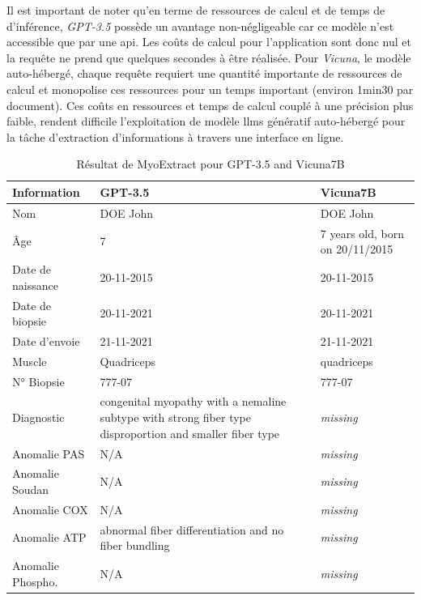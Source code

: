 Il est important de noter qu'en terme de ressources de calcul et de temps de d'inférence, \textit{GPT-3.5} possède un avantage non-négligeable car ce modèle n'est accessible que par une \gls{api}. Les coûts de calcul pour l'application sont donc nul et la requête ne prend que quelques secondes à être réalisée. Pour \textit{Vicuna}, le modèle auto-hébergé, chaque requête requiert une quantité importante de ressources de calcul et monopolise ces ressources pour un temps important (environ 1min30 par document). Ces coûts en ressources et temps de calcul couplé à une précision plus faible, rendent difficile l'exploitation de modèle \gls{llms} génératif auto-hébergé pour la tâche d'extraction d'informations à travers une interface en ligne.
\begin{table}[ht]
\centering
\caption{Résultat de MyoExtract pour GPT-3.5 and Vicuna7B}
\label{tab:json_data}
\begin{tabularx}{\textwidth}{|X|X|X|}
\hline
\textbf{Information} & \textbf{GPT-3.5} & \textbf{Vicuna7B} \\ \hline
Nom & DOE John & DOE John \\ \hline
Âge & 7 & 7 years old, born on 20/11/2015 \\ \hline
Date de naissance & 20-11-2015 & 20-11-2015 \\ \hline
Date de biopsie & 20-11-2021 & 20-11-2021 \\ \hline
Date d'envoie & 21-11-2021 & 21-11-2021 \\ \hline
Muscle & Quadriceps & quadriceps \\ \hline
N° Biopsie & 777-07 & 777-07 \\ \hline
Diagnostic & congenital myopathy with a nemaline subtype with strong fiber type disproportion and smaller fiber type & \textit{missing} \\ \hline
Anomalie PAS & N/A & \textit{missing} \\ \hline
Anomalie Soudan & N/A & \textit{missing} \\ \hline
Anomalie COX & N/A & \textit{missing} \\ \hline
Anomalie ATP & abnormal fiber differentiation and no fiber bundling & \textit{missing} \\ \hline
Anomalie Phospho. & N/A & \textit{missing} \\ \hline
\end{tabularx}
\end{table}

